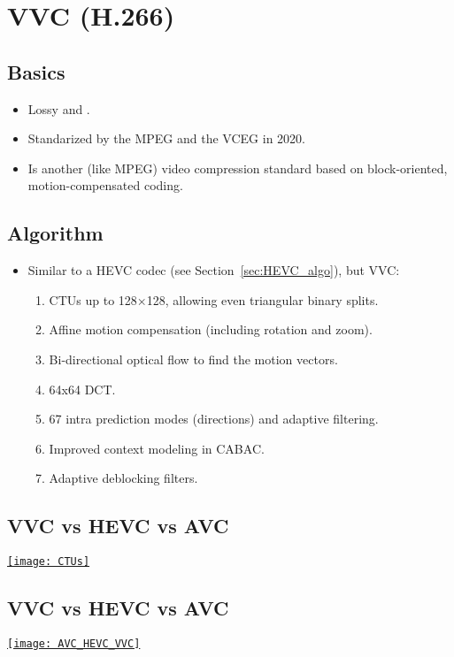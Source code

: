 \chapter{\gls{VVC} (H.266)}

\section{Basics}
\begin{itemize}
\item Lossy and .
\item Standarized by the \gls{MPEG} and the \gls{VCEG} in 2020.
\item Is another (like \gls{MPEG}) video compression standard based on
  block-oriented, motion-compensated coding.
\end{itemize}

\section{Algorithm}
\begin{itemize}
\item Similar to a \gls{HEVC} codec (see Section~\ref{sec:HEVC_algo}),
  but \gls{VVC}:
\begin{enumerate}
\item \glspl{CTU} up to 128×128, allowing even triangular binary splits.
\item Affine motion compensation (including rotation and zoom).
\item Bi-directional optical flow to find the motion vectors.
\item 64x64 \gls{DCT}.
\item 67 intra prediction modes (directions) and adaptive filtering.
\item Improved context modeling in \gls{CABAC}.
\item Adaptive deblocking filters.
\end{enumerate}
\end{itemize}

\section{VVC vs HEVC vs AVC}
\begin{center}
  \href{https://thebroadcastknowledge.com/2020/11/25/video-the-new-video-codec-landscape-vvc-evc-hevc-lc-evc-av1-and-more/}{\texttt{[image: CTUs]}}
\end{center}

\section*{VVC vs HEVC vs AVC}
\begin{center}
  \href{https://www.linkedin.com/pulse/video-coding-standards-comparison-sraas}{\texttt{[image: AVC\_HEVC\_VVC]}}
\end{center}

